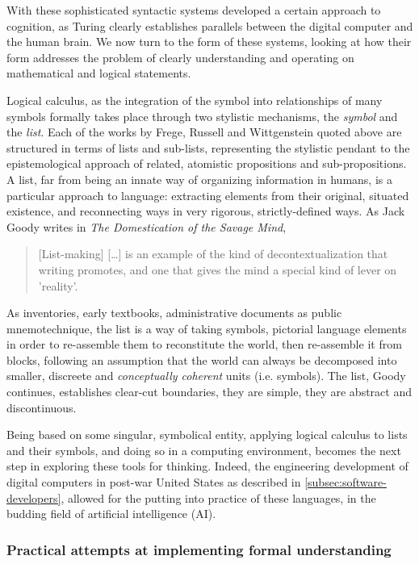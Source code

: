 With these sophisticated syntactic systems developed a certain approach to cognition, as Turing clearly establishes parallels between the digital computer and the human brain. We now turn to the form of these systems, looking at how their form addresses the problem of clearly understanding and operating on mathematical and logical statements.

Logical calculus, as the integration of the symbol into relationships of many symbols formally takes place through two stylistic mechanisms, the \emph{symbol} and the \emph{list}. Each of the works by Frege, Russell and Wittgenstein quoted above are structured in terms of lists and sub-lists, representing the stylistic pendant to the epistemological approach of related, atomistic propositions and sub-propositions. A list, far from being an innate way of organizing information in humans, is a particular approach to language: extracting elements from their original, situated existence, and reconnecting ways in very rigorous, strictly-defined ways. As Jack Goody writes in \emph{The Domestication of the Savage Mind},

\begin{quote}
    [List-making] [\dots] is an example of the kind of decontextualization that writing promotes, and one that gives the mind a special kind of lever on 'reality'. \citep{goody_domestication_1977}
\end{quote}

As inventories, early textbooks, administrative documents as public mnemotechnique, the list is a way of taking symbols, pictorial language elements in order to re-assemble them to reconstitute the world, then re-assemble it from blocks, following an assumption that the world can always be decomposed into smaller, discreete and \emph{conceptually coherent} units (i.e. symbols). The list, Goody continues, establishes clear-cut boundaries, they are simple, they are abstract and discontinuous.

Being based on some singular, symbolical entity, applying logical calculus to lists and their symbols, and doing so in a computing environment, becomes the next step in exploring these tools for thinking. Indeed, the engineering development of digital computers in post-war United States as described in \ref{subsec:software-developers}, allowed for the putting into practice of these languages, in the budding field of artificial intelligence (AI).

\subsubsection{Practical attempts at implementing formal understanding}

